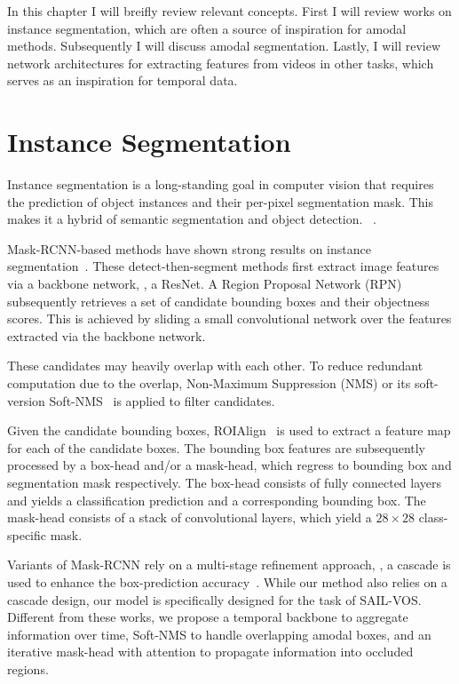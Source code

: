 In this chapter I will breifly review relevant concepts. First I will review works on instance segmentation, which are often a source of inspiration for amodal methods.
Subsequently I will discuss amodal segmentation. Lastly, I will review network architectures for extracting features from videos in other tasks, which serves as an inspiration for temporal data. 
\section{Instance Segmentation}

Instance segmentation is a long-standing goal in computer vision that requires the prediction of object instances and their per-pixel segmentation mask. This makes it a hybrid of semantic segmentation and object detection.
~\cite{BarinovaPAMI2012, RiemenschneiderECCV2012, KimCVPR2012, PinheiroNIPS2015, DaiCVPR2016, PinheiroECCV2016, DaiECCV2016, LiCVPR2017, liu2018path, fang2019instaboost, yolacticcv2019, lee2020centermask, Cao_D2Det_CVPR_2020, wang2020solo}.

Mask-RCNN-based methods have shown strong results on instance segmentation~\cite{he2017mask, cai2018cascade, liu2018path, chen2019hybrid}. These detect-then-segment methods first extract image features via a backbone network, \eg, a ResNet. A Region Proposal Network (RPN)~\cite{ren2015faster} subsequently retrieves a set of candidate bounding boxes and their objectness scores. This is achieved by sliding a small convolutional network over the features extracted via the  backbone network. 

These candidates may  heavily overlap with each other. %
To reduce redundant computation due to the overlap, Non-Maximum Suppression (NMS) or its soft-version Soft-NMS~\cite{bodla2017soft} is applied to filter   candidates. 

Given the candidate bounding boxes,  ROIAlign~\cite{he2017mask} is used to extract a feature map for each of the candidate boxes. The bounding box features are subsequently processed by a box-head and/or a mask-head, which regress to bounding box and segmentation mask respectively. The box-head consists of fully connected layers and yields a classification prediction and a  corresponding bounding box.  %
The mask-head consists of a stack of convolutional layers, which yield a $28 \times 28$ class-specific mask. 

Variants of Mask-RCNN rely on a multi-stage refinement approach, \ie, a cascade is used to enhance the box-prediction accuracy~\cite{cai2018cascade, chen2019hybrid}. While our method also relies on a cascade design, our model is specifically designed for the task of SAIL-VOS. Different from these works, we propose a temporal backbone to aggregate information over time, Soft-NMS to handle overlapping amodal boxes, and an iterative mask-head with attention to propagate information into occluded regions. 

